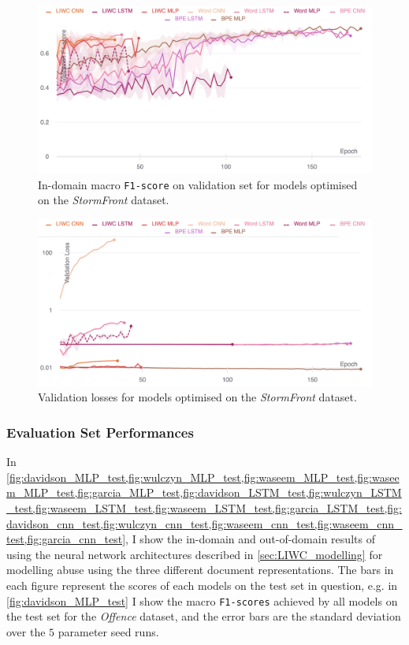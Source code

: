\begin{figure}
    \centering
    \includegraphics[width=\textwidth]{garcia_dev_f1.pdf}
    \caption{In-domain macro \texttt{F1-score} on validation set for models optimised on the \textit{StormFront} dataset.}
    \label{fig:garcia_dev_f1}
\end{figure}
\begin{figure}
    \centering
    \includegraphics[width=\textwidth]{garcia_dev_loss_stderr_logscale.pdf}
    \caption{Validation losses for models optimised on the \textit{StormFront} dataset.}
    \label{fig:garcia_dev_loss}
\end{figure}

\subsubsection{Evaluation Set Performances}
In \cref{fig:davidson_MLP_test,fig:wulczyn_MLP_test,fig:waseem_MLP_test,fig:waseem_MLP_test,fig:garcia_MLP_test,fig:davidson_LSTM_test,fig:wulczyn_LSTM_test,fig:waseem_LSTM_test,fig:waseem_LSTM_test,fig:garcia_LSTM_test,fig:davidson_cnn_test,fig:wulczyn_cnn_test,fig:waseem_cnn_test,fig:waseem_cnn_test,fig:garcia_cnn_test}, I show the in-domain and out-of-domain results of using the neural network architectures described in \cref{sec:LIWC_modelling} for modelling abuse using the three different document representations.
The bars in each figure represent the scores of each models on the test set in question, e.g. in \cref{fig:davidson_MLP_test} I show the macro \texttt{F1-scores} achieved by all models on the test set for the \textit{Offence} dataset, and the error bars are the standard deviation over the $5$ parameter seed runs.

